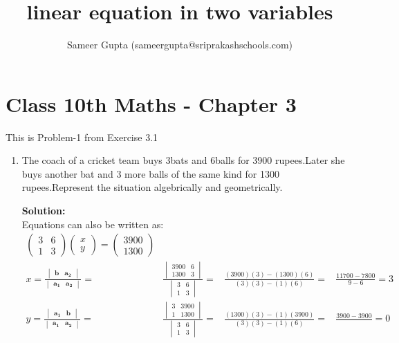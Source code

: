 \documentclass[12pt]{article}
\title{linear equation in two variables}
\author{Sameer Gupta (sameergupta@sriprakashschools.com)}
\newcommand{\myvec}[1]{\ensuremath{\begin{pmatrix}#1\end{pmatrix}}}
\newcommand{\mydet}[1]{\ensuremath{\begin{vmatrix}#1\end{vmatrix}}}
\newcommand{\solution}{\noindent \textbf{Solution: }}
\let\vec\mathbf
\begin{document}
\maketitle
\section*{Class 10th  Maths - Chapter 3}
This is Problem-1 from Exercise 3.1
\begin{enumerate}
\item The coach of a cricket team buys 3bats and 6balls for 3900 rupees.Later she buys another bat and 3 more balls of the same kind for 1300 rupees.Represent the situation algebrically and geometrically.

\solution\\
            Equations  can also be written as:\\     
\begin{align}
\myvec{3&6\\1&3}\myvec{x\\y} = \myvec{3900\\1300}\\
x=\frac{\mydet{ \vec{b} & \vec{a_2}}}{\mydet{ \vec{a_1} &\vec{a_2} }} =&
\frac{\mydet{ 3900 & 6 \\ 1300 & 3 }}{\mydet{3&6\\1&3}} =&
\frac{(3900)(3)-(1300)(6)}{(3)(3)-(1)(6)} =&
\frac{11700-7800}{9-6} =3  \\
y=\frac{\mydet{\vec{a_1}&\vec{b}}}{\mydet{\vec{a_1}&\vec{a_2}}} =&
\frac{\mydet{3&3900\\1&1300}}{\mydet{3&6\\1&3}} =&
\frac{(1300)(3)-(1)(3900)}{(3)(3)-(1)(6)} =&
\frac{3900-3900}{} = 0\\
\end{align}

\end{enumerate}
\end{document}
